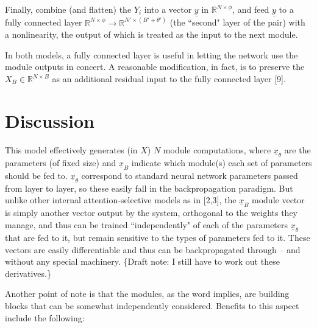 \documentclass[12pt]{article}
\begin{document}
Finally, combine (and flatten) the $Y_i$ into a vector $\underline{y}$ in $\mathbb{R}^{N\times\phi}$, and feed $\underline{y}$ to a fully connected layer $\mathbb{R}^{N\times\phi} \rightarrow \mathbb{R}^{N'\times(B'+\theta')}$ (the ``second" layer of the pair) with a nonlinearity, the output of which is treated as the input to the next module.
\par 
In both models, a fully connected layer is useful in letting the network use the module outputs in concert.  A reasonable modification, in fact, is to preserve the $X_B \in \mathbb{R}^{N\times B}$ as an additional residual input to the fully connected layer [9].

\section{Discussion}\label{Discussion}
This model effectively generates (in $X$) $N$ module computations, where $\underline{x}_\theta$ are the parameters (of fixed size) and $\underline{x}_B$ indicate which module(s) each set of parameters should be fed to.  $\underline{x}_\theta$ correspond to standard neural network parameters passed from layer to layer, so these easily fall in the backpropagation paradigm.  But unlike other internal attention-selective models as in [2,3], the $\underline{x}_B$ module vector is simply another vector output by the system, orthogonal to the weights they manage, and thus can be trained ``independently" of each of the parameters $\underline{x}_\theta$ that are fed to it, but remain sensitive to the types of parameters fed to it.  These vectors are easily differentiable and thus can be backpropagated through -- and without any special machinery.  \{Draft note: I still have to work out these derivatives.\}\par
Another point of note is that the modules, as the word implies, are building blocks that can be somewhat independently considered.  Benefits to this aspect include the following:
\end{document}
